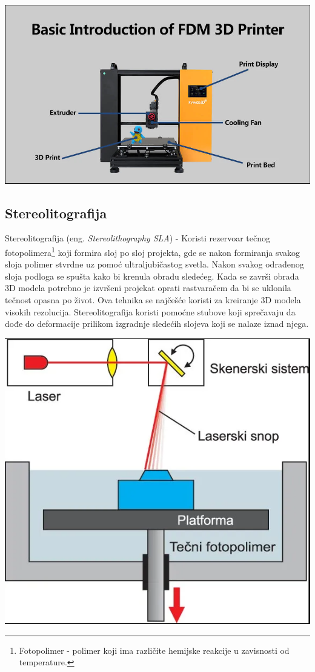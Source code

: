 \documentclass[a4paper]{article}
\begin{document}
\begin{center}
\includegraphics[width=.5\textwidth ]{Tehnikeslike/FDM.PNG}
\end{center}

\subsection{Stereolitografija}
\label{subsec:podnaslov3}
Stereolitografija (eng. \emph{Stereolithography SLA}) - Koristi rezervoar tečnog fotopolimera\footnote{Fotopolimer - polimer koji ima različite hemijske reakcije u zavisnosti od temperature.}  koji formira sloj po sloj projekta, gde se nakon formiranja svakog sloja polimer stvrdne uz pomoć ultraljubičastog svetla.
\bigbreak Nakon svakog odrađenog sloja podloga se spušta kako bi krenula obradu sledećeg. Kada se završi obrada 3D modela potrebno je izvršeni projekat oprati rastvaračem da bi se uklonila tečnost opasna po život.
\bigbreak Ova tehnika se najčešće koristi za kreiranje 3D modela visokih rezolucija.  Stereolitografija koristi pomoćne stubove koji sprečavaju da dođe do deformacije prilikom izgradnje sledećih slojeva koji se nalaze iznad njega.


\begin{center}
\includegraphics[width=.5\textwidth ]{Tehnikeslike/Stereolitografija.PNG}
\end{center}

\bigbreak
\bigbreak
\end{document}
